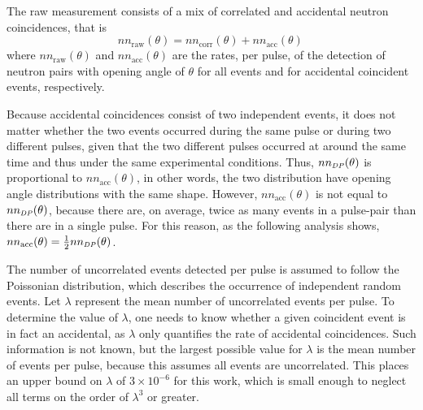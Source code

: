 The raw measurement consists of a mix of correlated and accidental neutron coincidences, that is
\begin{equation}
\label{eq:corr_uncorr}
nn_{\text{raw}}(\theta)= nn_{\text{corr}}(\theta) + nn_{\text{acc}}(\theta) \,
\end{equation}
where $nn_{\text{raw}}(\theta)$ and $nn_{\text{acc}}(\theta)$ are the rates, per pulse, of the detection of neutron pairs with opening angle of $\theta$ for all events and for accidental coincident events, respectively.

Because accidental coincidences consist of two independent events, it does not matter whether the two events occurred during the same pulse or during two different pulses, given that the two different pulses occurred at around the same time and thus under the same experimental conditions.
Thus, $nn_{\scaleto{DP}{4pt}}(\theta)$ is proportional to $nn_{\text{acc}}(\theta)$, in other words, the two distribution have opening angle distributions with the same shape.
However, $nn_{\text{acc}}(\theta)$ is not equal to $nn_{\scaleto{DP}{4pt}}(\theta)$, because there are, on average, twice as many events in a pulse-pair than there are in a single pulse.
For this reason, as the following analysis shows,~$nn_{\text{acc}}(\theta) = \frac{1}{2}nn_{\scaleto{DP}{4pt}}(\theta)$.

The number of uncorrelated events detected per pulse is assumed to follow the Poissonian distribution, which describes the occurrence of independent random events.
Let $\lambda$ represent the mean number of uncorrelated events per pulse.
To determine the value of $\lambda$, one needs to know whether a given coincident event is in fact an accidental, as $\lambda$ only quantifies the rate of accidental coincidences.
Such information is not known, but the largest possible value for $\lambda$ is the mean number of events per pulse, because this assumes all events are uncorrelated.
This places an upper bound on $\lambda$ of $3\times 10^{-6}$ for this work, which is small enough to neglect all terms on the order of $\lambda^3$ or greater.

